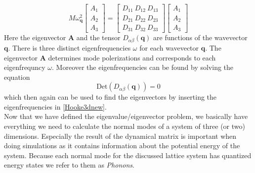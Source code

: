 \begin{equation}
    M\omega_{\mathbf{q}}^{2}\begin{bmatrix}
           A_{1} \\
           A_{2} \\
           A_{3}
         \end{bmatrix}=\begin{bmatrix}
           D_{11} \ D_{12} \ D_{13}\\
           D_{21} \ D_{22} \ D_{23}\\
           D_{31} \ D_{32} \ D_{33}
         \end{bmatrix}\begin{bmatrix}
           A_{1} \\
           A_{2} \\
           A_{3}
         \end{bmatrix}
\end{equation} Here the eigenvector $\mathbf{A}$ and the tensor $D_{\alpha\beta}(\mathbf{q})$ are functions of the wavevector $\mathbf{q}$. There is three distinct eigenfrequencies $\omega$ for each wavevector $\mathbf{q}$. The eigenvector $\mathbf{A}$ determines mode polerizations and corresponds to each eigenfrequncy $\omega$. Moreover the eigenfrequencies can be found by solving the equation\begin{equation}
    \text{Det}(D_{\alpha\beta}(\mathbf{q}))=0 
\end{equation}which then again can be used to find the eigenvectors by inserting the eigenfrequencies in \cref{Hooke3dnew}. \\
Now that we have defined the eigenvalue/eigenvector problem, we basically have everything we need to calculate the normal modes of a system of three (or two) dimensions. Especially the result of the dynamical matrix is important when doing simulations as it contains information about the potential energy of the system. Because each normal mode for the discussed lattice system has quantized energy states we refer to them as \textit{Phonons}.
 
